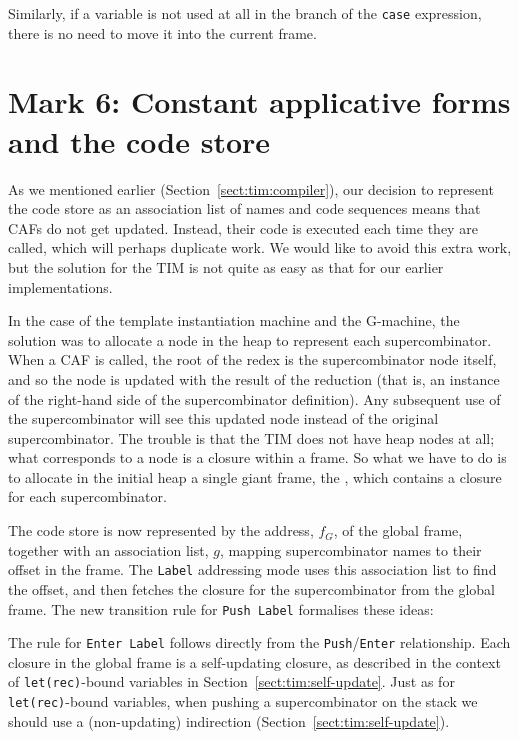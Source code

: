 Similarly, if a variable is not used at all in the branch of the
\mbox{\tt case} expression, there is no need to move it into the current frame.

\section{Mark 6: Constant applicative forms and the code store\advanced}
\label{sect:tim:caf}

As we mentioned earlier (Section~\ref{sect:tim:compiler}),
our decision to represent
the code store as an association list of names and code sequences
means that CAFs do not get updated.  Instead, their code is
executed each time they are called, which will perhaps duplicate
work.  We would like to avoid this extra work, but the solution for
the TIM is not quite as easy as that for our earlier implementations.

In the case of the template instantiation machine and the G-machine,
the solution was to allocate a node in the heap to represent
each supercombinator.  When a CAF is called, the root of the redex is
the supercombinator node itself, and so the node is updated with
the result of the reduction (that is, an instance of the right-hand
side of the supercombinator definition).   Any subsequent use of the
supercombinator will see this updated node instead of the
original supercombinator.
The trouble is that the TIM does not have heap nodes at all; what corresponds
to a node is a closure within a frame.  So what we have to do is
to allocate in the initial heap a single giant frame, the
,
which contains a closure for each supercombinator.

The code store is now represented by the address, $f_G$, of the global frame,
together with an association list, $g$,
mapping supercombinator names to their offset in the frame.
The \mbox{\tt Label} addressing mode uses this association list to find the offset, and
then fetches the closure for the supercombinator from the global frame.
The new transition rule for \mbox{\tt Push\ Label} formalises these
ideas:

The rule for \mbox{\tt Enter\ Label} follows directly from the \mbox{\tt Push}/\mbox{\tt Enter}
relationship.
Each closure in the global frame is a self-updating
closure, as described in the context of \mbox{\tt let(rec)}-bound variables
in Section~\ref{sect:tim:self-update}.   Just as for \mbox{\tt let(rec)}-bound variables,
when pushing a supercombinator on the stack we should use a (non-updating)
indirection (Section~\ref{sect:tim:self-update}).

